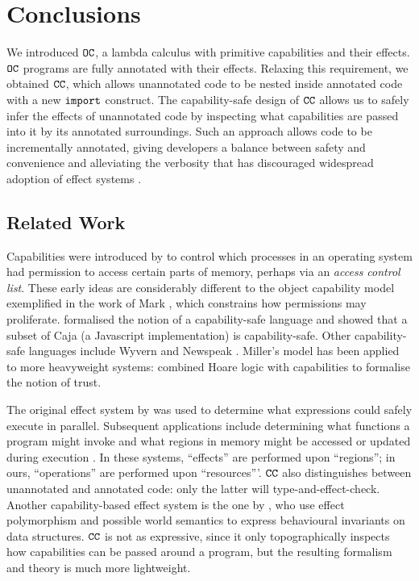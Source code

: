 \section{Conclusions}

We introduced $\mathtt{OC}$, a lambda calculus with primitive capabilities and their effects. $\mathtt{OC}$ programs are fully annotated with their effects. Relaxing this requirement, we obtained $\mathtt{CC}$, which allows unannotated code to be nested inside annotated code with a new $\mathtt{import}$ construct. The capability-safe design of $\mathtt{CC}$ allows us to safely infer the effects of unannotated code by inspecting what capabilities are passed into it by its annotated surroundings. Such an approach allows code to be incrementally annotated, giving developers a balance between safety and convenience and alleviating the verbosity that has discouraged widespread adoption of effect systems \cite{rytz12}.

\subsection{Related Work}

Capabilities were introduced by \citet{dennis66} to control which processes in an operating system had permission to access certain parts of memory, perhaps via an \textit{access control list}. These early ideas are considerably different to the object capability model exemplified in the work of Mark \citet{miller06}, which constrains how permissions may proliferate. \citet{maffeis10} formalised the notion of a capability-safe language and showed that a subset of Caja (a Javascript implementation) is capability-safe. Other capability-safe languages include Wyvern \cite{nistor13} and Newspeak \cite{bracha10}. Miller's model has been applied to more heavyweight systems: \citet{drossopoulou07} combined Hoare logic with capabilities to formalise the notion of trust.

The original effect system by \citet{lucassen88} was used to determine what expressions could safely execute in parallel. Subsequent applications include determining what functions a program might invoke \cite{tang94} and what regions in memory might be accessed or updated during execution \cite{talpin94}. In these systems, ``effects'' are performed upon ``regions''; in ours, ``operations'' are performed upon ``resources'''. $\mathtt{CC}$ also distinguishes between unannotated and annotated code: only the latter will type-and-effect-check. Another capability-based effect system is the one by \citet{devriese16}, who use effect polymorphism and possible world semantics to express behavioural invariants on data structures. $\mathtt{CC}$ is not as expressive, since it only topographically inspects how capabilities can be passed around a program, but the resulting formalism and theory is much more lightweight.

